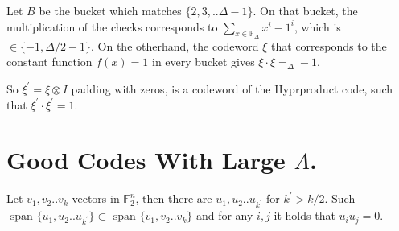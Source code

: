 \documentclass[manuscript,screen,review]{acmart}
\begin{document}
  Let $B$ be the bucket which matches $\{2,3,..\Delta-1\}$. On that bucket, the multiplication of the checks corresponds to $\sum_{x\in \mathbb{F}_{\Delta}}x^{i} - 1^i$, which is $\in \{ -1, \Delta/2 - 1 \}$. On the otherhand, the codeword $\xi$ that corresponds to the constant function $f(x)= 1$ in every bucket gives $\xi \cdot \xi =_{\Delta} -1$.

  So $\xi^{\prime} = \xi \otimes I$ padding with zeros, is a codeword of the Hyprproduct code, such that $\xi^{\prime}\cdot \xi^{\prime} = 1$.  


\section{Good Codes With Large $\Lambda$.}
\newcommand*{\DETAILS}{}
\ifdefined\DETAILS


\fi

\begin{claim}
    \label{claim:find}
    Let $v_{1},v_{2}..v_{k}$ vectors in $\mathbb{F}_{2}^{n}$, then there are $u_{1},u_{2}..u_{k^{\prime}}$ for $k^{\prime} > k/2$. Such $\text{ span } \{   u_{1},u_{2}..u_{k^{\prime}} \} \subset \text{ span } \{ v_{1},v_{2}..v_{k} \}$ and for any $i,j$ it holds that $u_{i}u_{j} = 0$. 
  \end{claim}
\end{document}
